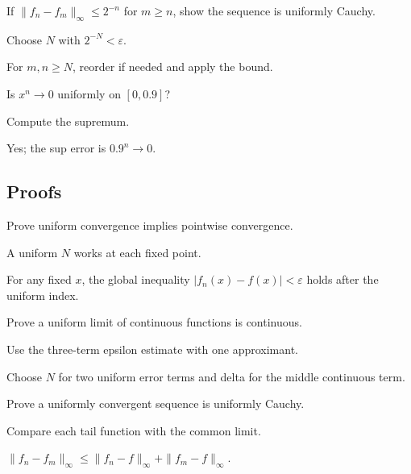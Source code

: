 \begin{exercise}\label{exr:ii11-expand-04}
If \(\|f_n-f_m\|_\infty\le2^{-n}\) for \(m\ge n\), show the sequence is uniformly Cauchy.
\end{exercise}
\begin{hint}
Choose \(N\) with \(2^{-N}<\varepsilon\).
\end{hint}
\begin{solution}
For \(m,n\ge N\), reorder if needed and apply the bound.
\end{solution}

\begin{exercise}\label{exr:ii11-expand-05}
Is \(x^n\to0\) uniformly on \([0,0.9]\)?
\end{exercise}
\begin{hint}
Compute the supremum.
\end{hint}
\begin{solution}
Yes; the sup error is \(0.9^n\to0\).
\end{solution}

\subsection*{Proofs}

\begin{exercise}\label{exr:ii11-expand-06}
Prove uniform convergence implies pointwise convergence.
\end{exercise}
\begin{hint}
A uniform \(N\) works at each fixed point.
\end{hint}
\begin{solution}
For any fixed \(x\), the global inequality \(|f_n(x)-f(x)|<\varepsilon\) holds after the uniform index.
\end{solution}

\begin{exercise}\label{exr:ii11-expand-07}
Prove a uniform limit of continuous functions is continuous.
\end{exercise}
\begin{hint}
Use the three-term epsilon estimate with one approximant.
\end{hint}
\begin{solution}
Choose \(N\) for two uniform error terms and delta for the middle continuous term.
\end{solution}

\begin{exercise}\label{exr:ii11-expand-08}
Prove a uniformly convergent sequence is uniformly Cauchy.
\end{exercise}
\begin{hint}
Compare each tail function with the common limit.
\end{hint}
\begin{solution}
\(\|f_n-f_m\|_\infty\le\|f_n-f\|_\infty+\|f_m-f\|_\infty\).
\end{solution}

